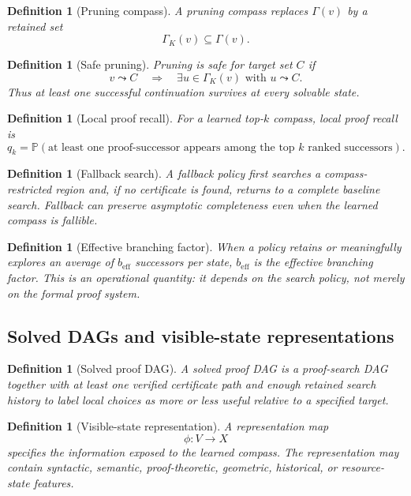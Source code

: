 \documentclass[11pt]{article}
\newtheorem{definition}[theorem]{Definition}
\newcommand{\Prob}{\mathbb{P}}
\begin{document}
\begin{definition}[Pruning compass]
A pruning compass replaces \(\Gamma(v)\) by a retained set
\[
\Gamma_K(v)\subseteq \Gamma(v).
\]
\end{definition}

\begin{definition}[Safe pruning]
Pruning is safe for target set \(C\) if
\[
v\leadsto C
\quad\Longrightarrow\quad
\exists u\in\Gamma_K(v)\text{ with }u\leadsto C.
\]
Thus at least one successful continuation survives at every solvable state.
\end{definition}

\begin{definition}[Local proof recall]
For a learned top-\(k\) compass, local proof recall is
\[
q_k=\Prob(\text{at least one proof-successor appears among the top \(k\) ranked successors}).
\]
\end{definition}

\begin{definition}[Fallback search]
A fallback policy first searches a compass-restricted region and, if no certificate is found, returns to a complete baseline search. Fallback can preserve asymptotic completeness even when the learned compass is fallible.
\end{definition}

\begin{definition}[Effective branching factor]
When a policy retains or meaningfully explores an average of \(b_{\mathrm{eff}}\) successors per state, \(b_{\mathrm{eff}}\) is the effective branching factor. This is an operational quantity: it depends on the search policy, not merely on the formal proof system.
\end{definition}

\subsection{Solved DAGs and visible-state representations}

\begin{definition}[Solved proof DAG]
A solved proof DAG is a proof-search DAG together with at least one verified certificate path and enough retained search history to label local choices as more or less useful relative to a specified target.
\end{definition}

\begin{definition}[Visible-state representation]
A representation map
\[
\phi:V\to X
\]
specifies the information exposed to the learned compass. The representation may contain syntactic, semantic, proof-theoretic, geometric, historical, or resource-state features.
\end{definition}
\end{document}

